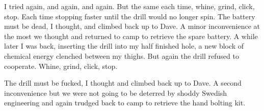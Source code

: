 I tried again, and again, and again. But the same each time, whine, grind, click, stop. Each time stopping faster until the drill would no longer spin. The battery must be dead, I thought, and climbed back up to Dave. A minor inconvenience at the most we thought and returned to camp to retrieve the spare battery. A while later I was back, inserting the drill into my half finished hole, a new block of chemical energy clenched between my thighs. But again the drill refused to cooperate. Whine, grind, click, stop. 

The drill must be fucked, I thought and climbed back up to Dave. A second inconvenience but we were not going to be deterred by shoddy Swedish engineering and again trudged back to camp to retrieve the hand bolting kit. 

\begin{pagefigure}
\centering
\begin{subfigure}[t]{0.49\textwidth}

\end{subfigure}
\end{pagefigure}
